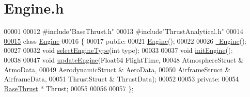 \hypertarget{_engine_8h_source}{}\section{Engine.\+h}
\label{_engine_8h_source}

\begin{DoxyCode}
00001 
00012 \textcolor{preprocessor}{#include"BaseThrust.h"}
00013 \textcolor{preprocessor}{#include"ThrustAnalytical.h"}
00014 
\hyperlink{group___engine}{00015} \textcolor{keyword}{class }\hyperlink{group___engine_class_engine}{Engine}
00016 \{
00017 \textcolor{keyword}{public}:
00021     \hyperlink{group___engine_a8c98683b0a3aa28d8ab72a8bcd0d52f2}{Engine}();
00022 
00026     \hyperlink{group___engine_a8ef7030a089ecb30bbfcb9e43094717a}{~Engine}();
00027 
00032     \textcolor{keywordtype}{void} \hyperlink{group___engine_ac33371d6fff86c0c8e14495f10046d9a}{selectEngineType}(\textcolor{keywordtype}{int} type);
00033 
00037     \textcolor{keywordtype}{void} \hyperlink{group___engine_aca6cc0dc7d537295123630a219142337}{initEngine}();
00038 
00047     \textcolor{keywordtype}{void} \hyperlink{group___engine_a9e16100ffd33cf8ec632257795c03865}{updateEngine}(Float64 FlightTime,
00048                         AtmosphereStruct & AtmoData,
00049                         AerodynamicStruct & AeroData,
00050                         AirframeStruct & AirframeData,
00051                         ThrustStruct & ThrustData);
00052 
00053 \textcolor{keyword}{private}:
00054     \hyperlink{group___engine_class_base_thrust}{BaseThrust} * Thrust;
00055 
00056 
00057 \};
\end{DoxyCode}
